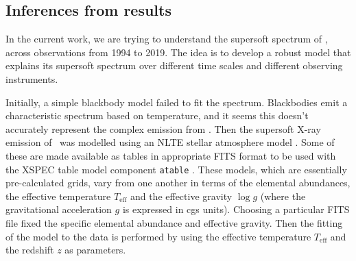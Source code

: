     \subsection{Inferences from results}
    In the current work, we are trying to understand the supersoft spectrum of \source, across observations from 1994 to 2019. The idea is to develop a robust model that explains its supersoft spectrum over different time scales and different observing instruments. %
    	
    Initially, a simple blackbody model failed to fit the spectrum. Blackbodies emit a characteristic spectrum based on temperature, and it seems this doesn't accurately represent the complex emission from \source. Then the supersoft X-ray emission of \source\ was modelled using an NLTE stellar atmosphere model \cite{werner1999classical}. Some of these are made available as tables in appropriate FITS format to be used with the XSPEC table model component \texttt{atable} \cite{rauch2003grid,rauch2010nlte}. These models, which are essentially pre-calculated grids, vary from one another in terms of the elemental abundances, the effective temperature $T_\text{eff}$ and the effective gravity $\log{g}$ (where the gravitational acceleration $g$ is expressed in cgs units). Choosing a particular FITS file fixed the specific elemental abundance and effective gravity. Then the fitting of the model to the data is performed by using the effective temperature $T_\text{eff}$ and the redshift $z$ as parameters.
    
